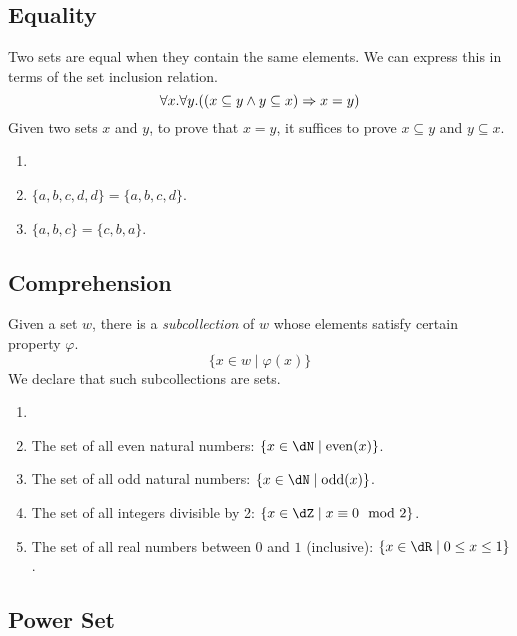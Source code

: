 \documentclass{amsart}
\begin{document}
\subsection{Equality}
\label{sec:equality}

Two sets are equal when they contain the same elements.
We can express this in terms of the set inclusion relation.
\[
  \forall x. \forall y. ((x \subseteq y \wedge y \subseteq x) \Rightarrow x = y)
\]
Given two sets $x$ and $y$, to prove that $x = y$, it suffices to prove $x \subseteq y$ and $y \subseteq x$.

\begin{eg}
  \begin{enumerate}
  \item[]
  \item $\{a,b,c,d,d\} = \{a,b,c,d\}$.
  \item $\{a,b,c\} = \{c,b,a\}$.
  \end{enumerate}
\end{eg}

\subsection{Comprehension}
\label{sec:comprehension}

Given a set $w$, there is a \emph{subcollection} of $w$ whose elements satisfy certain property $\varphi$.
\[
  \{ x \in w \mid \varphi(x) \}
\]
We declare that such subcollections are sets.

\begin{eg}
  \begin{enumerate}
  \item[]
  \item The set of all even natural numbers: $\{ x \in \dN \mid \mathrm{even}(x) \}$.
  \item The set of all odd natural numbers: $\{ x \in \dN \mid \mathrm{odd}(x) \}$.
  \item The set of all integers divisible by 2: $\{ x \in \dZ \mid x \cng 0 \mod 2 \}$.
  \item The set of all real numbers between $0$ and $1$ (inclusive): $\{ x \in \dR \mid 0 \leq x \leq 1 \}$.
  \end{enumerate}
\end{eg}

\subsection{Power Set}
\label{sec:power-set}
\end{document}
